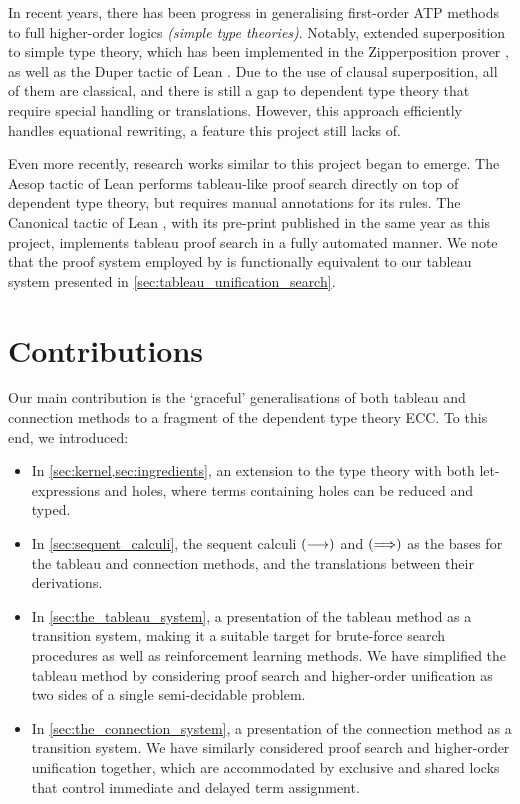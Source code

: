 \documentclass[twoside]{report}
\begin{document}
In recent years, there has been progress in generalising first-order ATP methods to full higher-order logics \emph{(simple type theories)}. Notably, \cite{bentkamp2021superposition,vukmirovic2021making} extended superposition to simple type theory, which has been implemented in the Zipperposition prover \cite{cruanes2014logtk}, as well as the Duper tactic of Lean \cite{clune2024duper}. Due to the use of clausal superposition, all of them are classical, and there is still a gap to dependent type theory that require special handling or translations. However, this approach efficiently handles equational rewriting, a feature this project still lacks of.

Even more recently, research works similar to this project began to emerge. The Aesop tactic of Lean \cite{limperg2023aesop} performs tableau-like proof search directly on top of dependent type theory, but requires manual annotations for its rules. The Canonical tactic of Lean \cite{norman2025canonical}, with its pre-print published in the same year as this project, implements tableau proof search in a fully automated manner. We note that the proof system employed by \cite{norman2025canonical} is functionally equivalent to our tableau system presented in \cref{sec:tableau_unification_search}.

\section{Contributions}
\label{sec:contributions}

Our main contribution is the `graceful' generalisations of both tableau and connection methods to a fragment of the dependent type theory ECC. To this end, we introduced:

\begin{itemize}
    \item In \cref{sec:kernel,sec:ingredients}, an extension to the type theory with both let-expressions and holes, where terms containing holes can be reduced and typed.

    \item In \cref{sec:sequent_calculi}, the sequent calculi $(\longrightarrow)$ and $(\Longrightarrow)$ as the bases for the tableau and connection methods, and the translations between their derivations.

    \item In \cref{sec:the_tableau_system}, a presentation of the tableau method as a transition system, making it a suitable target for brute-force search procedures as well as reinforcement learning methods. We have simplified the tableau method by considering proof search and higher-order unification as two sides of a single semi-decidable problem.

    \item In \cref{sec:the_connection_system}, a presentation of the connection method as a transition system. We have similarly considered proof search and higher-order unification together, which are accommodated by exclusive and shared locks that control immediate and delayed term assignment.
\end{itemize}
\end{document}
